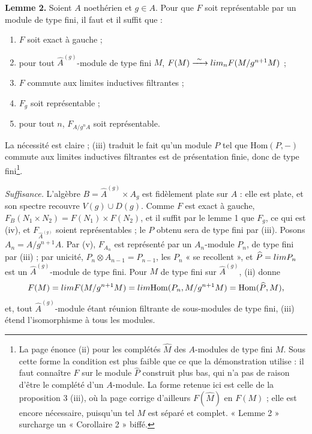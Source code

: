 \documentclass[11pt,a4paper]{article}
\begin{document}
\textbf{Lemme 2.} Soient $A$ noethérien et $g \in A$. Pour que $F$ soit
représentable par un module de type fini, il faut et il suffit que :
\begin{enumerate}
\item[(i)] $F$ soit exact à gauche ;
\item[(ii)] pour tout $\widehat{A}^{(g)}$-module de type fini $M$,
$F(M) \xrightarrow{\ \sim\ } \varprojlim_n F(M/g^{n+1}M)$ ;
\item[(iii)] $F$ commute aux limites inductives filtrantes ;
\item[(iv)] $F_g$ soit représentable ;
\item[(v)] pour tout $n$, $F_{A/g^{n}A}$ soit représentable.
\end{enumerate}
La nécessité est claire ; (iii) traduit le fait qu'un module $P$ tel que
$\mathrm{Hom}(P, -)$ commute aux limites inductives filtrantes est de
présentation finie, donc de type fini\footnote{La page énonce (ii) pour les
complétés $\widehat{M}$ des $A$-modules de type fini $M$. Sous cette forme la
condition est plus faible que ce que la démonstration utilise : il faut
connaître $F$ sur le module $\widehat{P}$ construit plus bas, qui n'a pas de
raison d'être le complété d'un $A$-module. La forme retenue ici est celle de la
proposition 3 (iii), où la page corrige d'ailleurs $F(\widehat{M})$ en
$F(M)$ ; elle est encore nécessaire, puisqu'un tel $M$ est séparé et complet.
« Lemme 2 » surcharge un « Corollaire 2 » biffé.}.

\emph{Suffisance.} L'algèbre $B = \widehat{A}^{(g)} \times A_g$ est fidèlement
plate sur $A$ : elle est plate, et son spectre recouvre
$V(g) \cup D(g)$. Comme $F$ est exact à gauche,
$F_B(N_1 \times N_2) = F(N_1) \times F(N_2)$, et il suffit par le lemme 1 que
$F_g$, ce qui est (iv), et $F_{\widehat{A}^{(g)}}$ soient représentables ; le
$P$ obtenu sera de type fini par (iii). Posons $A_n = A/g^{n+1}A$. Par (v),
$F_{A_n}$ est représenté par un $A_n$-module $P_n$, de type fini par (iii) ;
par unicité, $P_{n} \otimes A_{n-1} = P_{n-1}$, les $P_n$ « se recollent », et
$\widehat{P} = \varprojlim P_n$ est un $\widehat{A}^{(g)}$-module de type fini.
Pour $M$ de type fini sur $\widehat{A}^{(g)}$, (ii) donne
\[
  F(M) = \varprojlim F(M/g^{n+1}M) = \varprojlim
  \mathrm{Hom}(P_n, M/g^{n+1}M) = \mathrm{Hom}(\widehat{P}, M),
\]
et, tout $\widehat{A}^{(g)}$-module étant réunion filtrante de sous-modules de
type fini, (iii) étend l'isomorphisme à tous les modules.
\end{document}
